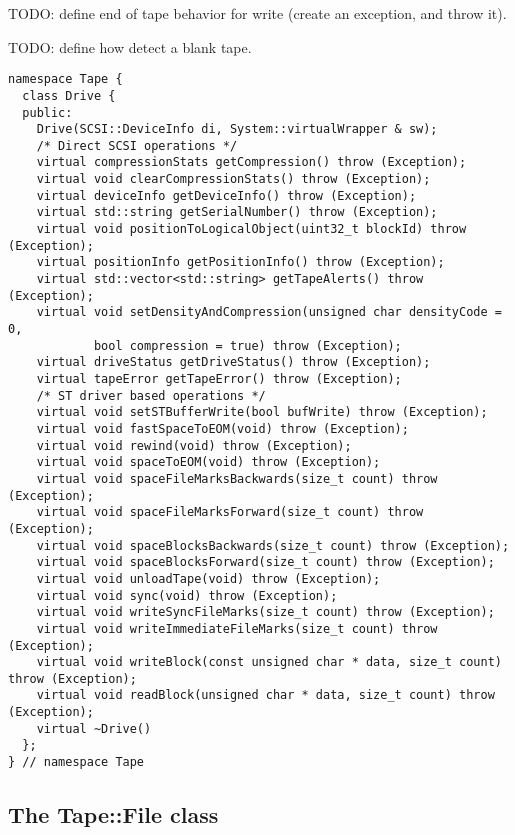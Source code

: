 TODO: define end of tape behavior for write (create an exception, and throw it).

TODO: define how detect a blank tape.

\begin{table}
\begin{lstlisting}[caption=Tape::Drive interface,label=drive_if]
namespace Tape {
  class Drive {
  public:
    Drive(SCSI::DeviceInfo di, System::virtualWrapper & sw);
    /* Direct SCSI operations */
    virtual compressionStats getCompression() throw (Exception);
    virtual void clearCompressionStats() throw (Exception);
    virtual deviceInfo getDeviceInfo() throw (Exception);
    virtual std::string getSerialNumber() throw (Exception);
    virtual void positionToLogicalObject(uint32_t blockId) throw (Exception);
    virtual positionInfo getPositionInfo() throw (Exception);
    virtual std::vector<std::string> getTapeAlerts() throw (Exception);
    virtual void setDensityAndCompression(unsigned char densityCode = 0,
            bool compression = true) throw (Exception);
    virtual driveStatus getDriveStatus() throw (Exception);
    virtual tapeError getTapeError() throw (Exception);
    /* ST driver based operations */
    virtual void setSTBufferWrite(bool bufWrite) throw (Exception);
    virtual void fastSpaceToEOM(void) throw (Exception);
    virtual void rewind(void) throw (Exception);
    virtual void spaceToEOM(void) throw (Exception);
    virtual void spaceFileMarksBackwards(size_t count) throw (Exception);
    virtual void spaceFileMarksForward(size_t count) throw (Exception);
    virtual void spaceBlocksBackwards(size_t count) throw (Exception);
    virtual void spaceBlocksForward(size_t count) throw (Exception);
    virtual void unloadTape(void) throw (Exception);
    virtual void sync(void) throw (Exception);
    virtual void writeSyncFileMarks(size_t count) throw (Exception);
    virtual void writeImmediateFileMarks(size_t count) throw (Exception);
    virtual void writeBlock(const unsigned char * data, size_t count) throw (Exception);
    virtual void readBlock(unsigned char * data, size_t count) throw (Exception);
    virtual ~Drive()
  };
} // namespace Tape
\end{lstlisting}
\end{table}

\subsection{The Tape::File class}


